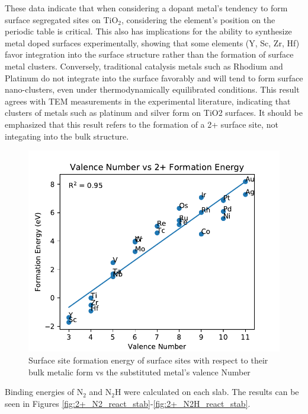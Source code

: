 \documentclass[catalysts,article,submit,moreauthors,pdftex,10pt,a4paper]{mdpi}
\theoremstyle{mdpi}
\newcounter{ex}
\newcounter{re}
\theoremstyle{mdpidefinition}
\begin{document}
These data indicate that when considering a dopant metal's tendency to form surface segregated sites on TiO$_2$, considering the element's position on the periodic table is critical. This also has implications for the ability to synthesize metal doped surfaces experimentally, showing that some elements (Y, Sc, Zr, Hf) favor integration into the surface structure rather than the formation of surface metal clusters. Conversely, traditional catalysis metals such as Rhodium and Platinum do not integrate into the surface favorably and will tend to form surface nano-clusters, even under thermodynamically equilibrated conditions. This result agrees with TEM measurements in the experimental literature, indicating that clusters of metals such as platinum and silver form on TiO2 surfaces.\cite{Iliev_2006} It should be emphasized that this result refers to the formation of a 2+ surface site, not integating into the bulk structure.

\begin{figure}
    \centering
    \includegraphics[width=0.8\linewidth]{Images/Valence_Number_vs_fe.pdf}
    \caption{Surface site formation energy of surface sites with respect to their bulk metalic form vs the substituted metal's valence Number}
    \label{fig:valence}
\end{figure}

Binding energies of N$_2$ and N$_2$H were calculated on each slab. The results can be seen in Figures \ref{fig:2+_N2_react_stab}-\ref{fig:2+_N2H_react_stab}. 
\end{document}
